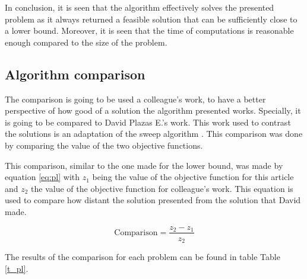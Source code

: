 \documentclass[10pt,twoside]{article}
\begin{document}
In conclusion, it is seen that the algorithm effectively solves the
presented problem as it always returned a feasible solution that can
be sufficiently close to a lower bound. Moreover, it is seen that the
time of computations is reasonable enough compared to the size of the
problem.

\subsection{Algorithm comparison}\label{sec_comp}
The comparison is going to be used a colleague's work, to have a
better perspective of how good of a solution the algorithm presented
works. Specially, it is going to be compared to David Plazas E.'s
work. This work used to contrast the solutions is an adaptation of the
sweep algorithm \citep{renaud2002}. This comparison was done by
comparing the value of the two objective functions.

This comparison, similar to the one made for the lower bound, was made
by equation \ref{eq:pl} with $z_1$ being the value of the objective
function for this article and $z_2$ the value of the objective
function for colleague's work. This equation is used to compare how
distant the solution presented from the solution that David made.

\begin{equation}
  \label{eq:pl}
  \text{Comparison} = \frac{z_2 - z_1}{z_2}
\end{equation}

The results of the comparison for each problem can be found in table
Table \ref{t_pl}.
\end{document}
